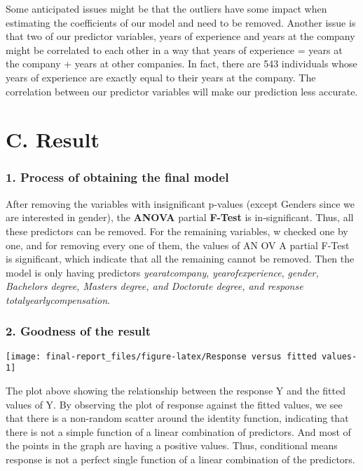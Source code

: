 \documentclass[
]{article}
\begin{document}
Some anticipated issues might be that the outliers have some impact when
estimating the coefficients of our model and need to be removed. Another
issue is that two of our predictor variables, years of experience and
years at the company might be correlated to each other in a way that
years of experience = years at the company + years at other companies.
In fact, there are 543 individuals whose years of experience are exactly
equal to their years at the company. The correlation between our
predictor variables will make our prediction less accurate.

\newpage

\hypertarget{c.-result}{%
\section{C. Result}\label{c.-result}}

\hypertarget{process-of-obtaining-the-final-model}{%
\subsubsection{1. Process of obtaining the final
model}\label{process-of-obtaining-the-final-model}}

After removing the variables with insignificant p-values (except Genders
since we are interested in gender), the \textbf{ANOVA} partial
\textbf{F-Test} is in-significant. Thus, all these predictors can be
removed. For the remaining variables, w checked one by one, and for
removing every one of them, the values of AN OV A partial F-Test is
significant, which indicate that all the remaining cannot be removed.
Then the model is only having predictors \emph{yearatcompany},
\emph{yearofexperience}, \emph{gender, Bachelors degree, Masters degree,
and Doctorate degree, and response totalyearlycompensation}.

\hypertarget{goodness-of-the-result}{%
\subsubsection{2. Goodness of the result}\label{goodness-of-the-result}}

\begin{center}\texttt{[image: final-report\_files/figure-latex/Response versus fitted values-1]} \end{center}

The plot above showing the relationship between the response Y and the
fitted values of Y. By observing the plot of response against the fitted
values, we see that there is a non-random scatter around the identity
function, indicating that there is not a simple function of a linear
combination of predictors. And most of the points in the graph are
having a positive values. Thus, conditional means response is not a
perfect single function of a linear combination of the predictors.
\end{document}

